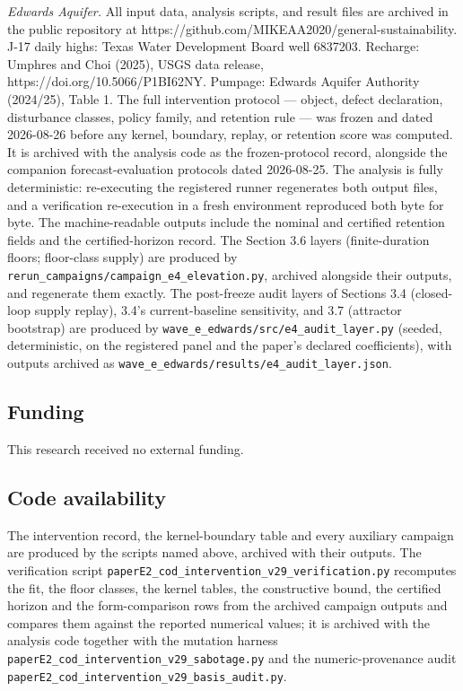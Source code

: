 \documentclass[11pt]{article}
\begin{document}
\emph{Edwards Aquifer.} All input data, analysis scripts, and result files are archived in the
public repository at
https://github.com/MIKEAA2020/general-sustainability. J-17 daily highs:
Texas Water Development Board well 6837203. Recharge: Umphres and Choi
(2025), USGS data release, https://doi.org/10.5066/P1BI62NY. Pumpage:
Edwards Aquifer Authority (2024/25), Table 1. The full intervention
protocol --- object, defect declaration, disturbance classes, policy
family, and retention rule --- was frozen and dated 2026-08-26 before
any kernel, boundary, replay, or retention score was computed. It is
archived with the analysis code as the frozen-protocol record, alongside
the companion forecast-evaluation protocols dated 2026-08-25. The
analysis is fully deterministic: re-executing the registered runner
regenerates both output files, and a verification re-execution in a
fresh environment reproduced both byte for byte. The machine-readable
outputs include the nominal and certified retention fields and the
certified-horizon record. The Section 3.6 layers (finite-duration
floors; floor-class supply) are produced by
\texttt{rerun\_campaigns/campaign\_e4\_elevation.py}, archived alongside
their outputs, and regenerate them exactly. The post-freeze audit layers
of Sections 3.4 (closed-loop supply replay), 3.4's current-baseline
sensitivity, and 3.7 (attractor bootstrap) are produced by
\texttt{wave\_e\_edwards/src/e4\_audit\_layer.py} (seeded,
deterministic, on the registered panel and the paper's declared
coefficients), with outputs archived as
\texttt{wave\_e\_edwards/results/e4\_audit\_layer.json}.

\subsection*{Funding}

This research received no external funding.

\subsection*{Code availability}

The intervention record, the kernel-boundary table and every auxiliary
campaign are produced by the scripts named above, archived with their
outputs. The verification script
\texttt{paperE2\_cod\_intervention\_v29\_verification.py} recomputes the
fit, the floor classes, the kernel tables, the constructive bound, the
certified horizon and the form-comparison rows from the archived campaign
outputs and compares them against the reported numerical values; it
is archived with the analysis code together with the mutation harness
\texttt{paperE2\_cod\_intervention\_v29\_sabotage.py} and the
numeric-provenance audit
\texttt{paperE2\_cod\_intervention\_v29\_basis\_audit.py}.
\end{document}
